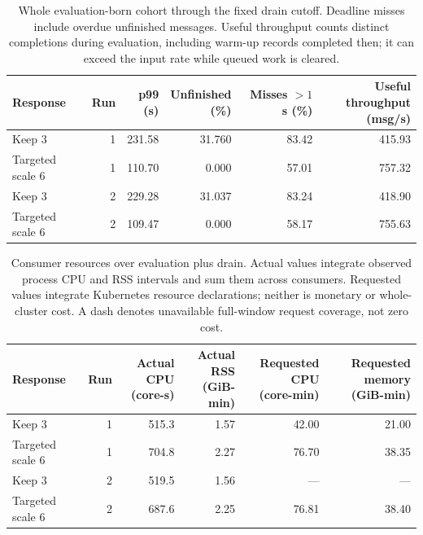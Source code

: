 \begin{table}[!htbp]
\centering\small
\setlength{\tabcolsep}{3pt}
\renewcommand{\arraystretch}{1.12}
\begin{tabular}{@{}lrrrrr@{}}
\toprule
Response & Run & \shortstack{p99\\(s)} & \shortstack{Unfinished\\(\%)} & \shortstack{Misses $>1$ s\\(\%)} & \shortstack{Useful throughput\\(msg/s)}\\
\midrule
Keep 3 & 1 & 231.58 & 31.760 & 83.42 & 415.93\\
Targeted scale 6 & 1 & 110.70 & 0.000 & 57.01 & 757.32\\
Keep 3 & 2 & 229.28 & 31.037 & 83.24 & 418.90\\
Targeted scale 6 & 2 & 109.47 & 0.000 & 58.17 & 755.63\\
\bottomrule
\end{tabular}
\caption{Whole evaluation-born cohort through the fixed drain cutoff. Deadline misses include overdue unfinished messages. Useful throughput counts distinct completions during evaluation, including warm-up records completed then; it can exceed the input rate while queued work is cleared.}
\label{tab:short-targeted-scaling-outcomes}
\end{table}
\begin{table}[!htbp]
\centering\small
\setlength{\tabcolsep}{3pt}
\renewcommand{\arraystretch}{1.12}
\begin{tabular}{@{}lrrrrr@{}}
\toprule
Response & Run & \shortstack{Actual CPU\\(core-s)} & \shortstack{Actual RSS\\(GiB-min)} & \shortstack{Requested CPU\\(core-min)} & \shortstack{Requested memory\\(GiB-min)}\\
\midrule
Keep 3 & 1 & 515.3 & 1.57 & 42.00 & 21.00\\
Targeted scale 6 & 1 & 704.8 & 2.27 & 76.70 & 38.35\\
Keep 3 & 2 & 519.5 & 1.56 & --- & ---\\
Targeted scale 6 & 2 & 687.6 & 2.25 & 76.81 & 38.40\\
\bottomrule
\end{tabular}
\caption{Consumer resources over evaluation plus drain. Actual values integrate observed process CPU and RSS intervals and sum them across consumers. Requested values integrate Kubernetes resource declarations; neither is monetary or whole-cluster cost. A dash denotes unavailable full-window request coverage, not zero cost.}
\label{tab:short-targeted-scaling-resources}
\end{table}

